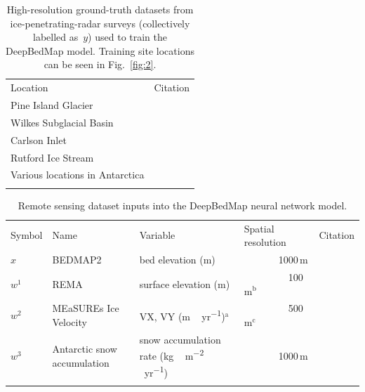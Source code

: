 \documentclass[tc, noline]{copernicus}
\begin{document}
\begin{table}[t]
  \caption{
    High-resolution ground-truth datasets from ice-penetrating-radar surveys (collectively labelled as~$y$) used to train the DeepBedMap model.
    Training site locations can be seen in Fig.~\ref{fig:2}.
  }
  \label{table:groundtruthdata}
  \begin{tabular}{ll}
  \tophline
  Location                        & Citation                                         \\
  \middlehline
  Pine Island Glacier             & \citet{BinghamDiverselandscapesPine2017}         \\
  Wilkes Subglacial Basin         & \citet{JordanHypothesismegaoutburstflooding2010} \\
  Carlson Inlet                   & \citet{KingIcestreamnot2011}                     \\
  Rutford Ice Stream              & \citet{KingSubglaciallandformsRutford2016}       \\
  Various locations in Antarctica & \citet{ShiMultichannelCoherentRadar2010}         \\
  \bottomhline
  \end{tabular}
  \belowtable{} %
\end{table}

\begin{table}[t]
  \caption{Remote sensing dataset inputs into the DeepBedMap neural network model.}
  \label{table:datainputs}
  \begin{tabular}{lllll}
  \tophline
  Symbol & Name                        & Variable                                           & Spatial resolution           & Citation                                         \\
  \middlehline
  $x$    & BEDMAP2                     & bed elevation (\unit{m})                           & {~~~~~~~}1000\,\unit{m}               & \citet{FretwellBedmap2improvedice2013}           \\
  $w^1$  & REMA                        & surface elevation (\unit{m})                       & {~~~~~~~~~}100\,\unit{m}$^{\mathrm{b}}$ & \citet{HowatReferenceElevationModel2018}         \\
  $w^2$  & MEaSUREs Ice Velocity       & VX, VY (\unit{m\,yr^{-1}})$^{\mathrm{a}}$          & {~~~~~~~~~}500\,\unit{m}$^{\mathrm{c}}$ & \citet{MouginotContinentwideinterferometric2019} \\
  $w^3$  & Antarctic snow accumulation & snow accumulation rate (\unit{kg\,m^{-2}\,yr^{-1}}) & {~~~~~~~}1000\,\unit{m}               & \citet{ArthernAntarcticsnowaccumulation2006}     \\
  \bottomhline
  \end{tabular}
\end{table}
\end{document}

